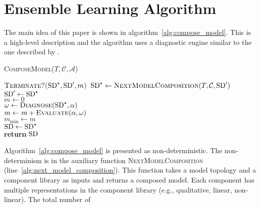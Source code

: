 \section{Ensemble Learning Algorithm}
%
The main idea of this paper is shown in
algorithm~\ref{alg:compose_model}. This is a high-level description
and the algorithm uses a diagnostic engine similar to the one
described by \cite{feldman13genius}.
%
\begin{algorithm}[htb]
\begin{footnotesize}
%
\caption{\textsc{ComposeModel}($T, \mathcal{C}, \mathcal{A}$)}
\label{alg:compose_model}
%
%
%
\vspace{0.075in}
%
\Repeat
{
$\textsc{Terminate?($\mathrm{SD}^\star, \mathrm{SD}^\prime, m$)}$
}
{
    $\mathrm{SD}^\star \gets \textsc{NextModelComposition}(T, \mathcal{C}, \mathrm{SD}^\prime)$\label{alg:next_model_composition}\\
    $\mathrm{SD}^\prime \gets \mathrm{SD}^\star$\\
    $m \gets 0$\\
    {
        $\omega \gets \textsc{Diagnose}(\mathrm{SD}^\star, \alpha)$\label{alg:diagnose}\\
        $m \gets m + \textsc{Evaluate}(\alpha, \omega)$\label{alg:evaluate}\\
    }
    {
        $m_{\min} \gets m$\\
        $\mathrm{SD} \gets \mathrm{SD}^\star$\label{alg:accept_end}\\
    }
}
\textbf{return} $\mathrm{SD}$
%
\end{footnotesize}
\end{algorithm}
%
\par
%
Algorithm~\ref{alg:compose_model} is presented as
non-deterministic. The non-determinism is in the auxiliary function
\textsc{NextModelComposition}
(line~\ref{alg:next_model_composition}). This function takes a model
topology and a component library as inputs and returns a composed
model. Each component has multiple representations in the component
library (e.g., qualitative, linear, non-linear). The total number of
